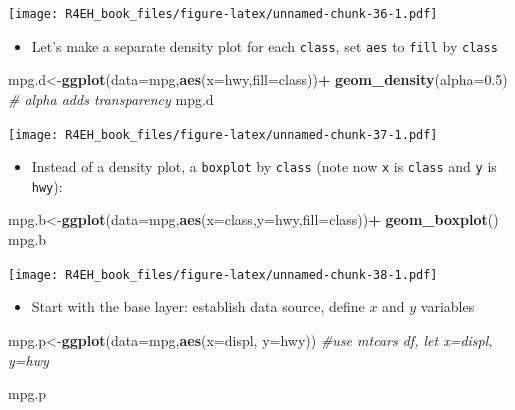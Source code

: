 \documentclass[]{book}
\newenvironment{Shaded}{\begin{snugshade}}{\end{snugshade}}
\newcommand{\KeywordTok}[1]{\textcolor[rgb]{0.13,0.29,0.53}{\textbf{#1}}}
\newcommand{\DataTypeTok}[1]{\textcolor[rgb]{0.13,0.29,0.53}{#1}}
\newcommand{\FloatTok}[1]{\textcolor[rgb]{0.00,0.00,0.81}{#1}}
\newcommand{\StringTok}[1]{\textcolor[rgb]{0.31,0.60,0.02}{#1}}
\newcommand{\CommentTok}[1]{\textcolor[rgb]{0.56,0.35,0.01}{\textit{#1}}}
\newcommand{\OperatorTok}[1]{\textcolor[rgb]{0.81,0.36,0.00}{\textbf{#1}}}
\newcommand{\NormalTok}[1]{#1}
\providecommand{\tightlist}{%
  \setlength{\itemsep}{0pt}\setlength{\parskip}{0pt}}
\theoremstyle{definition}
\theoremstyle{definition}
\theoremstyle{definition}
\theoremstyle{remark}
\begin{document}
\texttt{[image: R4EH\_book\_files/figure-latex/unnamed-chunk-36-1.pdf]}

\begin{itemize}
\tightlist
\item
  Let's make a separate density plot for each \texttt{class}, set
  \texttt{aes} to \texttt{fill} by \texttt{class}
\end{itemize}

\begin{Shaded}
\begin{Highlighting}[]
\NormalTok{mpg.d<-}\KeywordTok{ggplot}\NormalTok{(}\DataTypeTok{data=}\NormalTok{mpg,}\KeywordTok{aes}\NormalTok{(}\DataTypeTok{x=}\NormalTok{hwy,}\DataTypeTok{fill=}\NormalTok{class))}\OperatorTok{+}
\StringTok{  }\KeywordTok{geom_density}\NormalTok{(}\DataTypeTok{alpha=}\FloatTok{0.5}\NormalTok{) }\CommentTok{# alpha adds transparency}
\NormalTok{mpg.d}
\end{Highlighting}
\end{Shaded}

\texttt{[image: R4EH\_book\_files/figure-latex/unnamed-chunk-37-1.pdf]}

\begin{itemize}
\tightlist
\item
  Instead of a density plot, a \texttt{boxplot} by \texttt{class} (note
  now \texttt{x} is \texttt{class} and \texttt{y} is \texttt{hwy}):
\end{itemize}

\begin{Shaded}
\begin{Highlighting}[]
\NormalTok{mpg.b<-}\KeywordTok{ggplot}\NormalTok{(}\DataTypeTok{data=}\NormalTok{mpg,}\KeywordTok{aes}\NormalTok{(}\DataTypeTok{x=}\NormalTok{class,}\DataTypeTok{y=}\NormalTok{hwy,}\DataTypeTok{fill=}\NormalTok{class))}\OperatorTok{+}
\StringTok{  }\KeywordTok{geom_boxplot}\NormalTok{()}
\NormalTok{mpg.b}
\end{Highlighting}
\end{Shaded}

\texttt{[image: R4EH\_book\_files/figure-latex/unnamed-chunk-38-1.pdf]}

\begin{itemize}
\tightlist
\item
  Start with the base layer: establish data source, define \(x\) and
  \(y\) variables
\end{itemize}

\begin{Shaded}
\begin{Highlighting}[]
\NormalTok{mpg.p<-}\KeywordTok{ggplot}\NormalTok{(}\DataTypeTok{data=}\NormalTok{mpg,}\KeywordTok{aes}\NormalTok{(}\DataTypeTok{x=}\NormalTok{displ, }\DataTypeTok{y=}\NormalTok{hwy)) }\CommentTok{#use mtcars df, let x=displ, y=hwy}

\NormalTok{mpg.p}
\end{Highlighting}
\end{Shaded}
\end{document}
